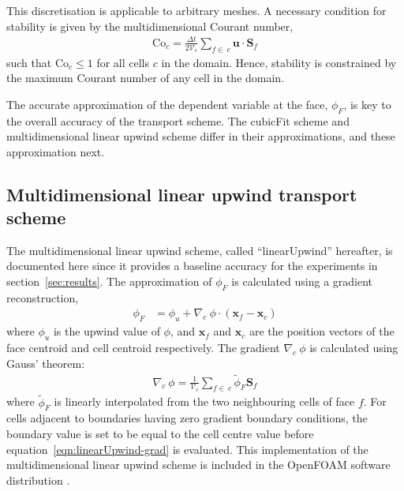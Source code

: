 This discretisation is applicable to arbitrary meshes.  A necessary condition for stability is given by the multidimensional Courant number,
\begin{align}
	\mathrm{Co}_c = \frac{\Delta t}{2 \mathcal{V}_c} \sum_{f \in\: c} \mathbf{u} \cdot \mathbf{S}_f
\end{align}
such that $\mathrm{Co}_c \leq 1$ for all cells $c$ in the domain.  Hence, stability is constrained by the maximum Courant number of any cell in the domain.

The accurate approximation of the dependent variable at the face, $\phi_F$, is key to the overall accuracy of the transport scheme. The cubicFit scheme and multidimensional linear upwind scheme differ in their approximations, and these approximation  next.




\subsection{Multidimensional linear upwind transport scheme}
The multidimensional linear upwind scheme, called ``linearUpwind'' hereafter, is documented here since it provides a baseline accuracy for the experiments in section~\ref{sec:results}.  The approximation of $\phi_F$ is calculated using a gradient reconstruction,
\begin{align}
	\phi_F &= \phi_u + \nabla_c\: \phi \cdot \left(\mathbf{x}_f - \mathbf{x}_c \right)
\end{align} 
where $\phi_u$ is the upwind value of $\phi$, and $\mathbf{x}_f$ and $\mathbf{x}_c$ are the position vectors of the face centroid and cell centroid respectively.
The gradient $\nabla_c \:\phi$ is calculated using Gauss' theorem:
\begin{align}
	\nabla_c\: \phi = \frac{1}{\mathcal{V}_c} \sum_{f\in\:c} \widetilde{\phi}_F \mathbf{S}_f \label{eqn:linearUpwind-grad}
\end{align}
where $\widetilde{\phi}_F$ is linearly interpolated from the two neighbouring cells of face $f$.  For cells adjacent to boundaries having zero gradient boundary conditions, the boundary value is set to be equal to the cell centre value before equation~\eqref{eqn:linearUpwind-grad} is evaluated.
This implementation of the multidimensional linear upwind scheme is included in the OpenFOAM software distribution \citep{openfoam}.

